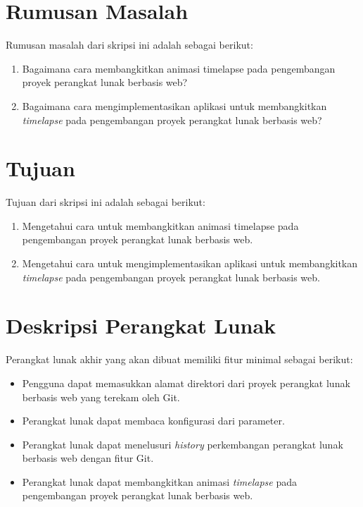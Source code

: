 \documentclass[a4paper,twoside]{article}
\begin{document}
\section{Rumusan Masalah}
Rumusan masalah dari skripsi ini adalah sebagai berikut:
\begin{enumerate}
	\item Bagaimana cara membangkitkan animasi timelapse pada pengembangan proyek perangkat lunak berbasis web?
	\item Bagaimana cara mengimplementasikan aplikasi untuk membangkitkan \textit{timelapse} pada pengembangan proyek perangkat lunak berbasis web?
\end{enumerate}
\section{Tujuan}
Tujuan dari skripsi ini adalah sebagai berikut:
\begin{enumerate}
	\item Mengetahui cara untuk membangkitkan animasi timelapse pada pengembangan proyek perangkat lunak berbasis web.
	\item Mengetahui cara untuk mengimplementasikan aplikasi untuk membangkitkan \textit{timelapse} pada pengembangan proyek perangkat lunak berbasis web. 
\end{enumerate} 
\section{Deskripsi Perangkat Lunak}
Perangkat lunak akhir yang akan dibuat memiliki fitur minimal sebagai berikut:
\begin{itemize}
	\item Pengguna dapat memasukkan alamat direktori dari proyek perangkat lunak berbasis web yang terekam oleh Git.
	\item Perangkat lunak dapat membaca konfigurasi dari parameter.
	\item Perangkat lunak dapat menelusuri \textit{history} perkembangan perangkat lunak berbasis web dengan fitur Git.   
	\item Perangkat lunak dapat membangkitkan animasi \textit{timelapse} pada pengembangan proyek perangkat lunak berbasis web.
	 
\end{itemize}
\end{document}
